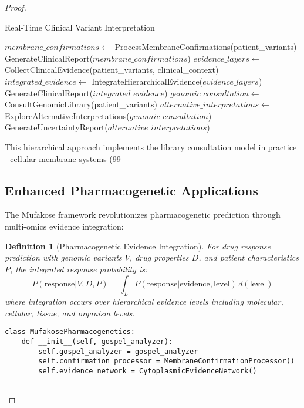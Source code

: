 \documentclass[12pt,a4paper]{article}
\newtheorem{definition}[theorem]{Definition}
\begin{document}
\begin{proof}
\begin{algorithm}
\caption{Real-Time Clinical Variant Interpretation}
\begin{algorithmic}
    \State $membrane\_confirmations \gets$ ProcessMembraneConfirmations(patient\_variants)
        \State \Return GenerateClinicalReport($membrane\_confirmations$)
    \Else
        \State $evidence\_layers \gets$ CollectClinicalEvidence(patient\_variants, clinical\_context)
        \State $integrated\_evidence \gets$ IntegrateHierarchicalEvidence($evidence\_layers$)
            \State \Return GenerateClinicalReport($integrated\_evidence$)
        \Else
            \State $genomic\_consultation \gets$ ConsultGenomicLibrary(patient\_variants)
            \State $alternative\_interpretations \gets$ ExploreAlternativeInterpretations($genomic\_consultation$)
            \State \Return GenerateUncertaintyReport($alternative\_interpretations$)
        \EndIf
    \EndIf
\EndProcedure
\end{algorithmic}
\end{algorithm}

This hierarchical approach implements the library consultation model in practice - cellular membrane systems (99%

\subsection{Enhanced Pharmacogenetic Applications}

The Mufakose framework revolutionizes pharmacogenetic prediction through multi-omics evidence integration:

\begin{definition}[Pharmacogenetic Evidence Integration]
For drug response prediction with genomic variants $V$, drug properties $D$, and patient characteristics $P$, the integrated response probability is:
$$P(\text{response}|V,D,P) = \int_L P(\text{response}|\text{evidence},\text{level}) \, d(\text{level})$$
where integration occurs over hierarchical evidence levels including molecular, cellular, tissue, and organism levels.
\end{definition}

\begin{lstlisting}[style=pythonstyle, caption=Mufakose-Enhanced Pharmacogenetic Analysis]
class MufakosePharmacogenetics:
    def __init__(self, gospel_analyzer):
        self.gospel_analyzer = gospel_analyzer
        self.confirmation_processor = MembraneConfirmationProcessor()
        self.evidence_network = CytoplasmicEvidenceNetwork()
    

\end{lstlisting}
\end{proof}
\end{document}
